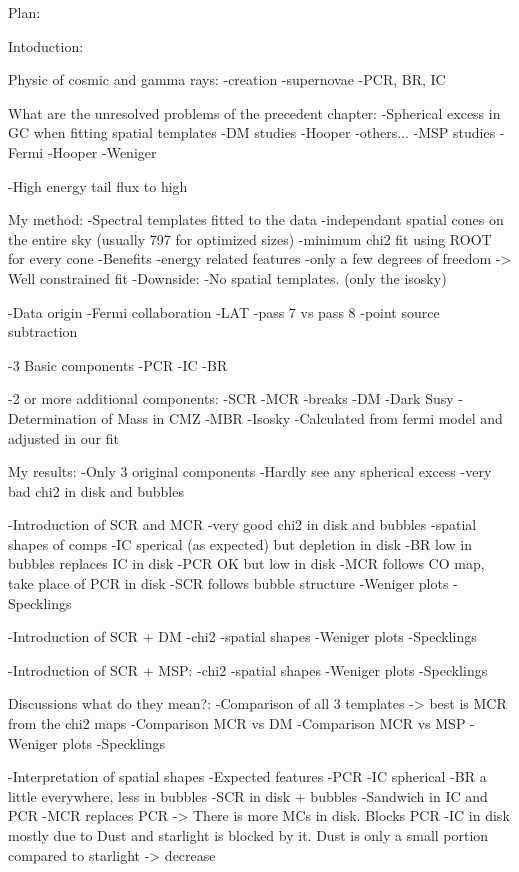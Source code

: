 Plan:

Intoduction:

Physic of cosmic and gamma rays:
	-creation
		-supernovae
	-PCR, BR, IC

What are the unresolved problems of the precedent chapter:
	-Spherical excess in GC when fitting spatial templates
		-DM studies
			-Hooper
			-others...
		-MSP studies
			-Fermi
			-Hooper
			-Weniger

	-High energy tail flux to high
	
	
My method:
	-Spectral templates fitted to the data
		-independant spatial cones on the entire sky (usually 797 for optimized sizes)
		-minimum chi2 fit using ROOT for every cone
		-Benefits
			-energy related features
			-only a few degrees of freedom -> Well constrained fit
		-Downside:
			-No spatial templates. (only the isosky)	
	
	-Data origin
		-Fermi collaboration
		-LAT
		-pass 7 vs pass 8
		-point source subtraction

	-3 Basic components
		-PCR
		-IC
		-BR
	
	-2 or more additional components:
		-SCR
		-MCR
			-breaks
		-DM
			-Dark Susy
			-Determination of Mass in CMZ
		-MBR
	-Isosky
		-Calculated from fermi model and adjusted in our fit




My results:
	-Only 3 original components
		-Hardly see any spherical excess
		-very bad chi2 in disk and bubbles

	-Introduction of SCR and MCR
		-very good chi2 in disk and bubbles
		-spatial shapes of comps
			-IC sperical (as expected) but depletion in disk
			-BR low in bubbles replaces IC in disk
			-PCR OK but low in disk
			-MCR follows CO map, take place of PCR in disk
			-SCR follows bubble structure
		-Weniger plots
		-Specklings

	-Introduction of SCR + DM
		-chi2
		-spatial shapes	
		-Weniger plots
		-Specklings

	-Introduction of SCR + MSP:
		-chi2
		-spatial shapes
		-Weniger plots
		-Specklings


Discussions what do they mean?:
	-Comparison of all 3 templates -> best is MCR from the chi2 maps
		-Comparison MCR vs DM
		-Comparison MCR vs MSP
		-Weniger plots
		-Specklings
	
	-Interpretation of spatial shapes
		-Expected features
			-PCR			
			-IC spherical
			-BR a little everywhere, less in bubbles			
			-SCR in disk + bubbles
		-Sandwich in IC and PCR
			-MCR replaces PCR -> There is more MCs in disk. Blocks PCR
			-IC in disk mostly due to Dust and starlight is blocked by it. Dust is only a small portion compared to starlight -> decrease
		
